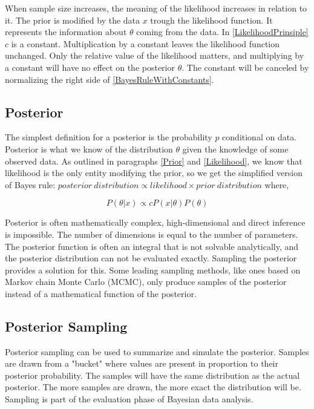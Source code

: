 When sample size increases, the meaning of the likelihood increases in relation to it. \cite{Mcelreath2015StatisticalRA} The prior is modified by the data $x$ trough the likelihood function. It represents the information about $\theta$ coming from the data. In \ref{LikelihoodPrinsiple} $c$ is a constant. Multiplication by a constant leaves the likelihood function unchanged. Only the relative value of the likelihood matters, and multiplying by a constant will have no effect on the posterior $\theta$. The constant will be canceled by normalizing the right side of \ref{BayesRuleWithConstants}.\cite{Box1973BayesianII}
 
\subsection{Posterior}\label{Posterior}
The simplest definition for a posterior is the probability $p$ conditional on data.\cite{Mcelreath2015StatisticalRA} Posterior is what we know of the distribution $\theta$ given the knowledge of some observed data. As outlined in paragraphs \ref{Prior} and \ref{Likelihood}, we know that likelihood is the only entity modifying the prior, so we get the simplified version of Bayes rule: $posterior\ distribution \propto likelihood \times prior\ distribution$ where,

\begin{equation}\label{BayesRuleWithConstants}
P(\theta|x) \propto cP(x|\theta)P(\theta)
\end{equation}\cite{Box1973BayesianII}

Posterior is often mathematically complex, high-dimensional and direct inference is impossible. The number of dimensions is equal to the number of parameters. The posterior function is often an integral that is not solvable analytically, and the posterior distribution can not be evaluated exactly. Sampling the posterior provides a solution for this.\cite{vandeSchoot2020BayesianSA} Some leading sampling methods, like ones based on Markov chain Monte Carlo (MCMC), only produce samples of the posterior instead of a mathematical function of the posterior.\cite{Mcelreath2015StatisticalRA}

\subsection{Posterior Sampling}\label{PosteriorSampling}

Posterior sampling can be used to summarize and simulate the posterior. Samples are drawn from a "bucket" where values are present in proportion to their posterior probability. The samples will have the same distribution as the actual posterior. The more samples are drawn, the more exact the distribution will be. Sampling is part of the evaluation phase of Bayesian data analysis.
\cite{Mcelreath2015StatisticalRA}

